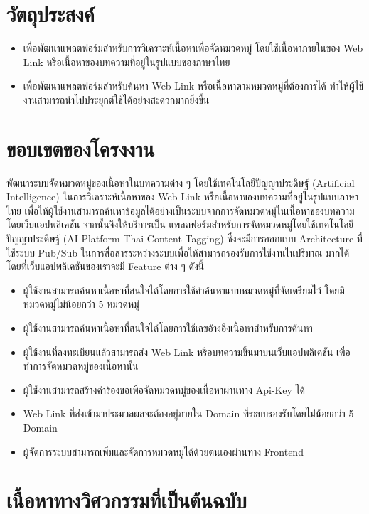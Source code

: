 \documentclass[12pt,oneside,openright,a4paper]{cpe-thai-project}
\begin{document}
\section{วัตถุประสงค์}
  \begin{itemize}
    \item  เพื่อพัฒนาแพลตฟอร์มสำหรับการวิเคราะห์เนื้อหาเพื่อจัดหมวดหมู่ โดยใช้เนื้อหาภายในของ Web Link หรือเนื้อหาของบทความที่อยู่ในรูปแบบของภาษาไทย
    \item  เพื่อพัฒนาแพลตฟอร์มสำหรับค้นหา Web Link หรือเนื้อหาตามหมวดหมู่ที่ต้องการได้ ทำให้ผู้ใช้งานสามารถนำไปประยุกต์ใช้ได้อย่างสะดวกมากยิ่งขึ้น
  \end{itemize}

\section{ขอบเขตของโครงงาน}

  \hspace{1cm}พัฒนาระบบจัดหมวดหมู่ของเนื้อหาในบทความต่าง ๆ โดยใช้เทคโนโลยีปัญญาประดิษฐ์ (Artificial Intelligence) ในการวิเคราะห์เนื้อหาของ Web Link 
  หรือเนื้อหาของบทความที่อยู่ในรูปแบบภาษาไทย เพื่อให้ผู้ใช้งานสามารถค้นหาข้อมูลได้อย่างเป็นระบบจากการจัดหมวดหมู่ในเนื้อหาของบทความโดยเว็บแอปพลิเคชัน จากนั้นจึงให้บริการเป็น
  แพลตฟอร์มสำหรับการจัดหมวดหมู่โดยใช้เทคโนโลยีปัญญาประดิษฐ์ (AI Platform Thai Content Tagging) ซึ่งจะมีการออกแบบ Architecture ที่ใช้ระบบ Pub/Sub ในการสื่อสารระหว่างระบบเพื่อให้สามารถรองรับการใช้งานในปริมาณ
  มากได้ โดยที่เว็บแอปพลิเคชันของเราจะมี Feature ต่าง ๆ ดังนี้
  \begin{itemize}
  \item  ผู้ใช้งานสามารถค้นหาเนื้อหาที่สนใจได้โดยการใช้คำค้นหาแบบหมวดหมู่ที่จัดเตรียมไว้ โดยมีหมวดหมู่ไม่น้อยกว่า 5 หมวดหมู่
  \item  ผู้ใช้งานสามารถค้นหาเนื้อหาที่สนใจได้โดยการใช้เลขอ้างอิงเนื้อหาสำหรับการค้นหา
  \item  ผู้ใช้งานที่ลงทะเบียนแล้วสามารถส่ง Web Link หรือบทความขึ้นมาบนเว็บแอปพลิเคชัน เพื่อทำการจัดหมวดหมู่ของเนื้อหานั้น
  \item  ผู้ใช้งานสามารถสร้างคำร้องขอเพื่อจัดหมวดหมู่ของเนื้อหาผ่านทาง Api-Key ได้ 
  \item  Web Link ที่ส่งเข้ามาประมวลผลจะต้องอยู่ภายใน Domain ที่ระบบรองรับโดยไม่น้อยกว่า 5 Domain
  \item  ผู้จัดการระบบสามารถเพิ่มและจัดการหมวดหมู่ได้ด้วยตนเองผ่านทาง Frontend
  \end{itemize}

\section{เนื้อหาทางวิศวกรรมที่เป็นต้นฉบับ}
\end{document}
